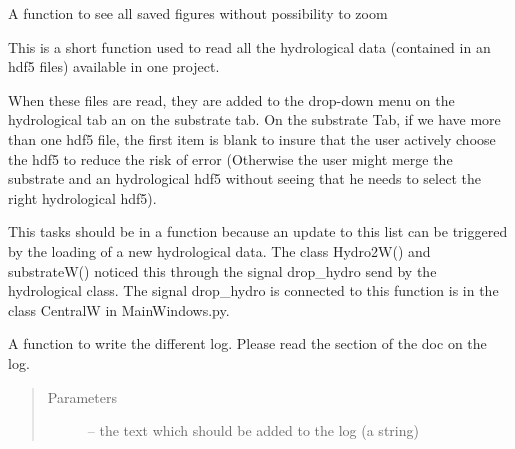 \documentclass[letterpaper,10pt,english]{sphinxmanual}
\begin{document}
\begin{fulllineitems}
\begin{fulllineitems}
\end{fulllineitems}


\begin{fulllineitems}
\label{\detokenize{index:src_GUI.Main_windows_1.CentralW.showfig2}}
A function to see all saved figures without possibility to zoom

\end{fulllineitems}


\begin{fulllineitems}
\label{\detokenize{index:src_GUI.Main_windows_1.CentralW.update_hydro_hdf5_name}}
This is a short function used to read all the hydrological data (contained in an hdf5 files) available in
one project.

When these files are read, they are added to the drop-down menu on the hydrological tab an on the substrate tab.
On the substrate Tab, if we have more than one hdf5 file, the first item is blank to insure that the user
actively choose the hdf5 to reduce the risk of error (Otherwise the user might merge the substrate and
an hydrological hdf5 without seeing that he needs to select the right hydrological hdf5).

This tasks should be in a function because an update to this list can be triggered by the loading of a new
hydrological data. The class Hydro2W() and substrateW() noticed this through the signal drop\_hydro
send by the hydrological class. The signal drop\_hydro is connected to this function is in the class
CentralW in MainWindows.py.

\end{fulllineitems}


\begin{fulllineitems}
\label{\detokenize{index:src_GUI.Main_windows_1.CentralW.write_log}}
A function to write the different log. Please read the section of the doc on the log.
\begin{quote}\begin{description}
\item[{Parameters}] \leavevmode
{} -- the text which should be added to the log (a string)


\end{description}
\end{quote}
\end{fulllineitems}
\end{fulllineitems}
\end{document}
